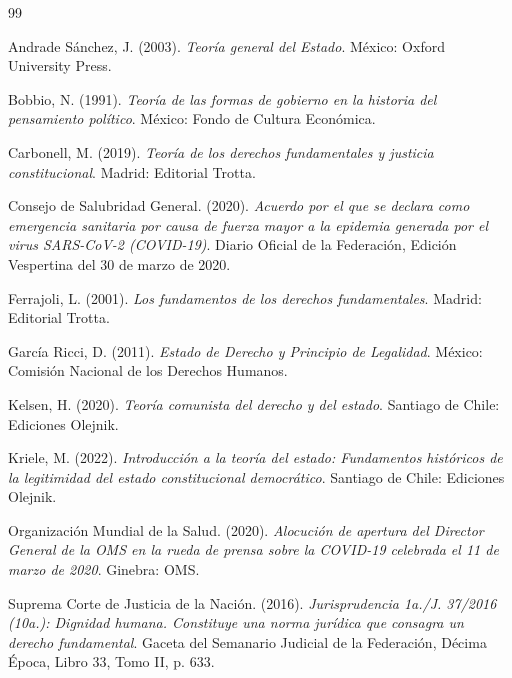 \documentclass[12pt,spanish,letterpaper,oneside]{article}
\begin{document}
\clearpage
\begin{thebibliography}{99}

Andrade S\'anchez, J. (2003). \emph{Teor\'ia general del Estado}. M\'exico: Oxford University Press.

Bobbio, N. (1991). \emph{Teor\'ia de las formas de gobierno en la historia del pensamiento pol\'itico}. M\'exico: Fondo de Cultura Econ\'omica.

Carbonell, M. (2019). \emph{Teor\'ia de los derechos fundamentales y justicia constitucional}. Madrid: Editorial Trotta.

Consejo de Salubridad General. (2020). \emph{Acuerdo por el que se declara como emergencia sanitaria por causa de fuerza mayor a la epidemia generada por el virus SARS-CoV-2 (COVID-19)}. Diario Oficial de la Federaci\'on, Edici\'on Vespertina del 30 de marzo de 2020.

Ferrajoli, L. (2001). \emph{Los fundamentos de los derechos fundamentales}. Madrid: Editorial Trotta.

Garc\'ia Ricci, D. (2011). \emph{Estado de Derecho y Principio de Legalidad}. M\'exico: Comisi\'on Nacional de los Derechos Humanos.

Kelsen, H. (2020). \emph{Teor\'ia comunista del derecho y del estado}. Santiago de Chile: Ediciones Olejnik.

Kriele, M. (2022). \emph{Introducci\'on a la teor\'ia del estado: Fundamentos hist\'oricos de la legitimidad del estado constitucional democr\'atico}. Santiago de Chile: Ediciones Olejnik.

Organizaci\'on Mundial de la Salud. (2020). \emph{Alocuci\'on de apertura del Director General de la OMS en la rueda de prensa sobre la COVID-19 celebrada el 11 de marzo de 2020}. Ginebra: OMS.

Suprema Corte de Justicia de la Naci\'on. (2016). \emph{Jurisprudencia 1a./J. 37/2016 (10a.): Dignidad humana. Constituye una norma jur\'idica que consagra un derecho fundamental}. Gaceta del Semanario Judicial de la Federaci\'on, D\'ecima \'Epoca, Libro 33, Tomo II, p. 633.


\end{thebibliography}
\end{document}
